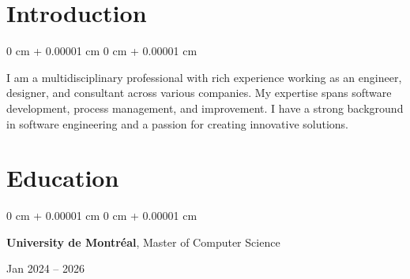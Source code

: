 \documentclass[10pt, letterpaper]{article}
\newenvironment{highlights}{
    \begin{itemize}[
        topsep=0.10 cm,
        parsep=0.10 cm,
        partopsep=0pt,
        itemsep=0pt,
        leftmargin=0 cm + 10pt
    ]
}{
    \end{itemize}
} %
\newenvironment{highlightsforbulletentries}{
    \begin{itemize}[
        topsep=0.10 cm,
        parsep=0.10 cm,
        partopsep=0pt,
        itemsep=0pt,
        leftmargin=10pt
    ]
}{
    \end{itemize}
} %
\newenvironment{onecolentry}{
    \begin{adjustwidth}{
        0 cm + 0.00001 cm
    }{
        0 cm + 0.00001 cm
    }
}{
    \end{adjustwidth}
} %
\newenvironment{twocolentry}[2][]{
    \onecolentry
    \def\secondColumn{#2}
    \setcolumnwidth{\fill, 6.5 cm}
    \begin{paracol}{2}
}{
    \switchcolumn \raggedleft \secondColumn
    \end{paracol}
    \endonecolentry
} %
\begin{document}







    \section{Introduction}
        \begin{onecolentry}
            I am a multidisciplinary professional with rich experience working as an engineer, designer, and consultant across various companies. My expertise spans software development, process management, and improvement. I have a strong background in software engineering and a passion for creating innovative solutions.
        \end{onecolentry}


    \section{Education} 
        \begin{twocolentry}{
            Jan 2024 – 2026
        }
            \textbf{University de Montréal}, Master of Computer Science
        \end{twocolentry}

\end{document}
